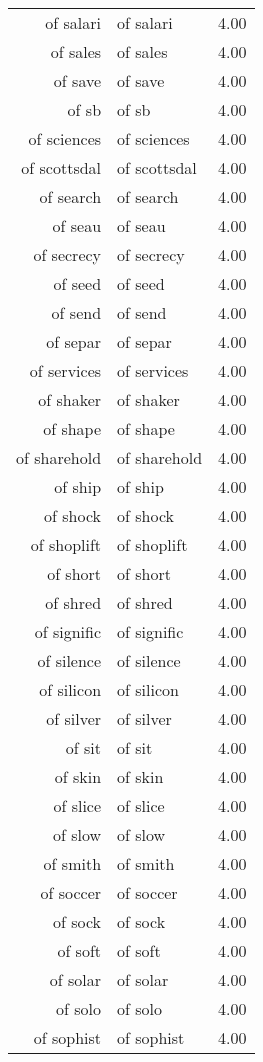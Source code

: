 \begin{table}[ht]
\begin{tabular}{rlr}
  of salari & of salari & 4.00 \\ 
  of sales & of sales & 4.00 \\ 
  of save & of save & 4.00 \\ 
  of sb & of sb & 4.00 \\ 
  of sciences & of sciences & 4.00 \\ 
  of scottsdal & of scottsdal & 4.00 \\ 
  of search & of search & 4.00 \\ 
  of seau & of seau & 4.00 \\ 
  of secrecy & of secrecy & 4.00 \\ 
  of seed & of seed & 4.00 \\ 
  of send & of send & 4.00 \\ 
  of separ & of separ & 4.00 \\ 
  of services & of services & 4.00 \\ 
  of shaker & of shaker & 4.00 \\ 
  of shape & of shape & 4.00 \\ 
  of sharehold & of sharehold & 4.00 \\ 
  of ship & of ship & 4.00 \\ 
  of shock & of shock & 4.00 \\ 
  of shoplift & of shoplift & 4.00 \\ 
  of short & of short & 4.00 \\ 
  of shred & of shred & 4.00 \\ 
  of signific & of signific & 4.00 \\ 
  of silence & of silence & 4.00 \\ 
  of silicon & of silicon & 4.00 \\ 
  of silver & of silver & 4.00 \\ 
  of sit & of sit & 4.00 \\ 
  of skin & of skin & 4.00 \\ 
  of slice & of slice & 4.00 \\ 
  of slow & of slow & 4.00 \\ 
  of smith & of smith & 4.00 \\ 
  of soccer & of soccer & 4.00 \\ 
  of sock & of sock & 4.00 \\ 
  of soft & of soft & 4.00 \\ 
  of solar & of solar & 4.00 \\ 
  of solo & of solo & 4.00 \\ 
  of sophist & of sophist & 4.00 \\ 

\end{tabular}
\end{table}
